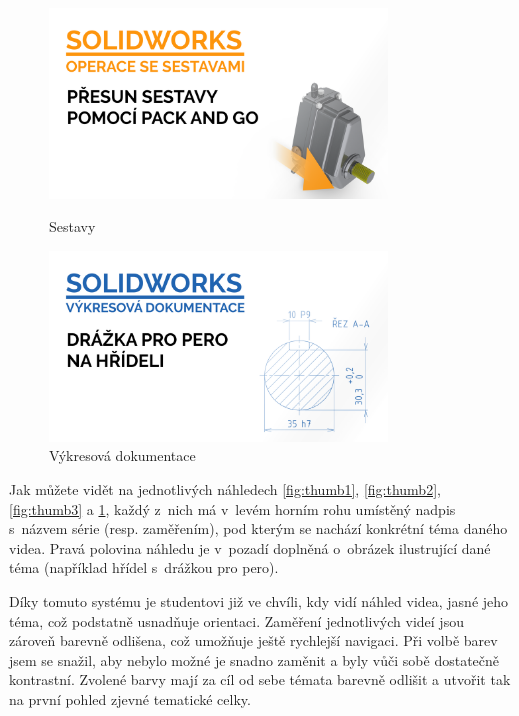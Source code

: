 \begin{figure}[htbp]
    \centering
    \begin{minipage}[b]{0.45\textwidth}
        \centering
        \includegraphics[width=0.8\textwidth]{img/020/pack-and-go-thumbnail.png}
        \caption{Sestavy}
        \label{fig:thumb3}
    \end{minipage}
    \qquad
    \begin{minipage}[b]{0.45\textwidth}
        \centering
        \includegraphics[width=0.8\textwidth]{img/020/dwg-perodr-hr-thumbnail.png}
        \caption{Výkresová dokumentace}
        \label{fig:thumb4}
    \end{minipage}
\end{figure}

Jak můžete vidět na jednotlivých náhledech \ref{fig:thumb1}, \ref{fig:thumb2}, \ref{fig:thumb3} a \ref{fig:thumb4}, každý z~nich má v~levém horním rohu umístěný nadpis s~názvem série (resp. zaměřením), pod kterým se nachází konkrétní téma daného videa.
Pravá polovina náhledu je v~pozadí doplněná o~obrázek ilustrující dané téma (například hřídel s~drážkou pro pero).

Díky tomuto systému je studentovi již ve chvíli, kdy vidí náhled videa, jasné jeho téma, což podstatně usnadňuje orientaci.
Zaměření jednotlivých videí jsou zároveň barevně odlišena, což umožňuje ještě rychlejší navigaci.
Při volbě barev jsem se snažil, aby nebylo možné je snadno zaměnit a byly vůči sobě dostatečně kontrastní.
Zvolené barvy mají za cíl od sebe témata barevně odlišit a utvořit tak na první pohled zjevné tematické celky.

